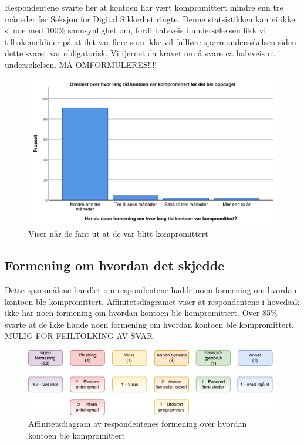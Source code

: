 Respondentene svarte her at kontoen har vært kompromittert mindre enn tre måneder før Seksjon for Digital Sikkerhet ringte. Denne statsistikken kan vi ikke si noe med 100\% sannsynlighet om, fordi halvveis i undersøkelsen fikk vi tilbakemeldiner på at det var flere som ikke vil fullføre spørreundersøkelsen siden dette svaret var obligatorisk. Vi fjernet da kravet om å svare ca halvveis ut i undersøkelsen.  MÅ OMFORMULERES!!!! 
\begin{figure}[H]
    \centering
    \includegraphics[scale=0.5]{case_2/bilder/spss/lang_tid_konto_kompromittert.pdf}
    \caption[fant-ut-kompromittert]{Viser når de fant ut at de var blitt kompromittert}
    \label{fig:fant-ut-kompromittert}
\end{figure}

\subsection{Formening om hvordan det skjedde}
Dette spørsmålene handlet om respondentene hadde noen formening om hvordan kontoen ble kompromittert. Affinitetsdiagramet viser at respondentene i hovedsak ikke har noen formening om hvordan kontoen ble kompromittert. Over 85\% svarte at de ikke hadde noen formening om hvordan kontoen ble kompromittert. MULIG FOR FEILTOLKING AV SVAR
\begin{figure}[H]
    \centering
    \includegraphics[scale=0.8]{case_2/bilder/Affinitetsdiagram.pdf}
    \caption[affinitetsdiagram]{Affinitetsdiagram av respondentenes formening over hvordan kontoen ble kompromittert}
    \label{fig:case2-affinitetsdiagram}
\end{figure}

